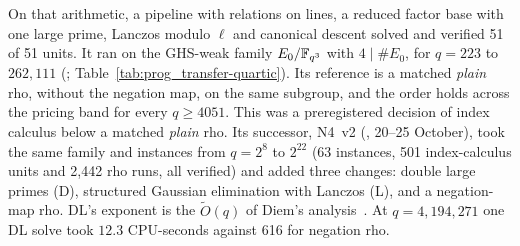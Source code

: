 On that arithmetic, a pipeline with relations on lines, a reduced factor base
with one large prime, Lanczos modulo $\ell$ and canonical descent solved and
verified 51 of 51 units. It ran on the GHS-weak family $E_0/\mathbb{F}_{q^3}$ with
$4\mid\#E_0$, for $q=223$ to $262{,}111$ (;
Table~\ref{tab:prog_transfer-quartic}). Its reference is a matched
\emph{plain} rho, without the negation map, on the same subgroup, and the
order holds across the pricing band for every $q\ge4051$.
This was a preregistered decision of index calculus below a matched
\emph{plain} rho. Its successor, N4~v2
(, 20--25 October), took the same
family and instances from $q=2^8$ to $2^{22}$ (63 instances, 501 index-calculus
units and 2{,}442 rho runs, all verified) and added three changes: double
large primes (D), structured Gaussian elimination with Lanczos (L), and a
negation-map rho. DL's exponent is the $\tilde O(q)$ of Diem's
analysis~\cite{diem2006,dt2008}. At $q=4{,}194{,}271$ one DL solve took
$12.3$ CPU-seconds against 616 for negation rho.

